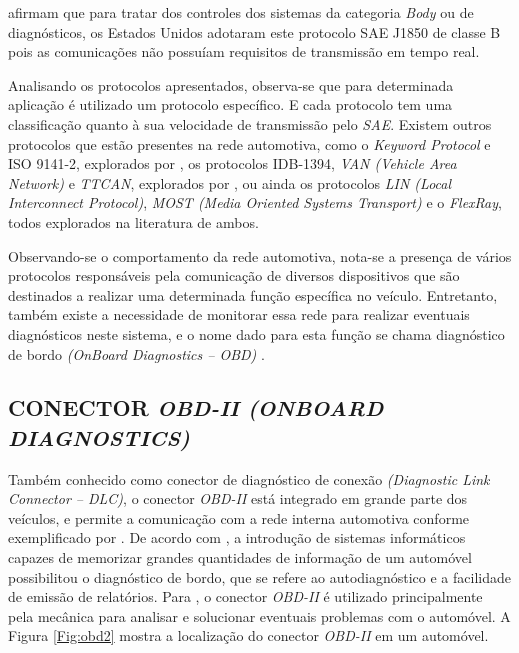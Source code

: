  afirmam que para tratar dos controles dos sistemas da categoria \textit{Body} ou de diagnósticos, os Estados Unidos adotaram este protocolo SAE J1850 de classe B pois as comunicações não possuíam requisitos de transmissão em tempo real.

Analisando os protocolos apresentados, observa-se que para determinada aplicação é utilizado um protocolo específico.  E cada protocolo tem uma classificação quanto à sua velocidade de transmissão pelo \textit{SAE}. Existem outros protocolos que estão presentes na rede automotiva, como o \textit{Keyword Protocol} e ISO 9141-2, explorados por , os protocolos IDB-1394, \textit{VAN (Vehicle Area Network)} e \textit{TTCAN}, explorados por , ou ainda os protocolos \textit{LIN (Local Interconnect Protocol)}, \textit{MOST (Media Oriented Systems Transport)} e o \textit{FlexRay}, todos explorados na literatura de ambos.

Observando-se o comportamento da rede automotiva, nota-se a presença de vários protocolos responsáveis pela comunicação de diversos dispositivos que são destinados a realizar uma determinada função específica no veículo. Entretanto, também existe a necessidade de monitorar essa rede para realizar eventuais diagnósticos neste sistema, e o nome dado para esta função se chama diagnóstico de bordo \textit{(OnBoard Diagnostics – OBD)} \cite{navetsimonotlion}.

\subsection{CONECTOR \textit{OBD-II (ONBOARD DIAGNOSTICS)}}\label{subsecaoobd}
Também conhecido como conector de diagnóstico de conexão \textit{(Diagnostic Link Connector – DLC)}, o conector \textit{OBD-II} está integrado em grande parte dos veículos, e permite a comunicação com a rede interna automotiva conforme exemplificado por . De acordo com , a introdução de sistemas informáticos capazes de memorizar grandes quantidades de informação de um automóvel possibilitou o diagnóstico de bordo, que se refere ao autodiagnóstico e a facilidade de emissão de relatórios. Para , o conector \textit{OBD-II} é utilizado principalmente pela mecânica para analisar e solucionar eventuais problemas com o automóvel. A Figura \ref{Fig:obd2} mostra a localização do conector \textit{OBD-II} em um automóvel.

